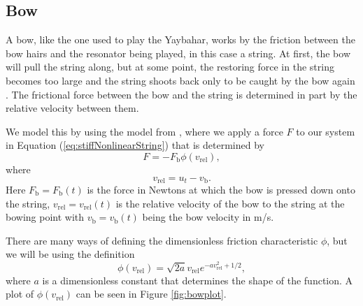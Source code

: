 \documentclass{article}
\begin{document}
\subsection{Bow}
\label{sec:bow}

A bow, like the one used to play the Yaybahar, works by the friction between the bow hairs and the resonator being played, in this case a string.
At first, the bow will pull the string along, but at some point, the restoring force in the string becomes too large and the string shoots back only to be caught by the bow again \cite[Chapter~2]{fletcher_physics_1998}.
The frictional force between the bow and the string is determined in part by the relative velocity between them.

We model this by using the model from \cite[Chapter~4]{bilbao_numerical_2009}, where we apply a force $F$ to our system in Equation (\ref{eq:stiffNonlinearString}) that is determined by
\begin{equation}
  \label{eq:bowForce}
  F = - F_\text{b} \phi(v_\text{rel}),
\end{equation}
where
\begin{equation}
  v_\text{rel} = u_t - v_\text{b}.
\end{equation}
Here $F_\text{b} = F_\text{b}(t)$ is the force in Newtons at which the bow is pressed down onto the string, $v_\text{rel} = v_\text{rel}(t)$ is the relative velocity of the bow to the string at the bowing point with $v_\text{b} = v_\text{b}(t)$ being the bow velocity in m/s.

There are many ways of defining the dimensionless friction characteristic $\phi$, but we will be using the definition
\begin{equation}
  \label{eq:phi}
  \phi(v_\text{rel}) = \sqrt{2a} v_\text{rel} e^{-a v_\text{rel}^2 + 1/2},
\end{equation}
where $a$ is a dimensionless constant that determines the shape of the function.
A plot of $\phi(v_\text{rel})$ can be seen in Figure \ref{fig:bowplot}.
\end{document}
